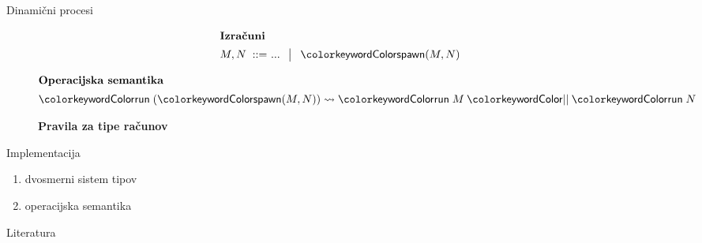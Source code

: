 \documentclass{beamer}
\theoremstyle{definition} %
\theoremstyle{plain} %
\begin{document}
	\begin{frame}{Dinamični procesi}
		
		\begin{figure}[hp]
			\parbox{\textwidth}{
				\centering
				\tiny
				\begin{align*}
				\shortintertext{\textbf{Izračuni}}
				M, N
				\bnfis & ... \,\bnfor\! \tmspawn{M}{N}
				\end{align*}
			} 
		\end{figure}
		
		\begin{figure}[tp]
			\centering
			\tiny
			\begin{align*}
			\shortintertext{\textbf{Operacijska semantika}}
			\tmrun{(\tmspawn{M}{N})} & \reduces \tmpar{\tmrun{M}}{\tmrun{N}}
			\end{align*}
		\end{figure}
	
	
		\begin{figure}[tp]
			\centering
			\tiny
			\textbf{Pravila za tipe računov}
			\begin{mathpar}
			\end{mathpar}
		\end{figure}
		
	\end{frame}
	
	
	
	
	\begin{frame}{Implementacija}
		\begin{enumerate}
			\item dvosmerni sistem tipov
			\item operacijska semantika
		\end{enumerate}
	\end{frame}
	
	
	
	
	\begin{frame}{Literatura}
				
		
		
	\end{frame}
	
	
\end{document}

